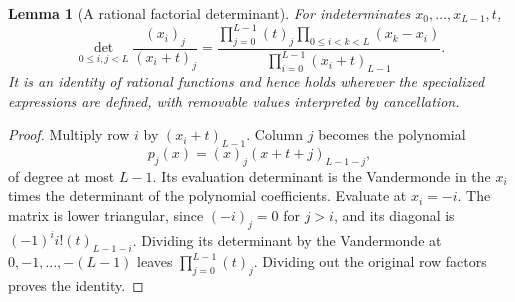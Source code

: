 \documentclass[11pt,letterpaper]{article}
\numberwithin{equation}{section}
\newtheorem{lemma}[theorem]{Lemma}
\theoremstyle{definition}\newtheorem{definition}[theorem]{Definition}
\theoremstyle{remark}\newtheorem{remark}[theorem]{Remark}
\begin{document}
\begin{lemma}[A rational factorial determinant]\label{lem:factorial-det}
For indeterminates $x_0,\ldots,x_{L-1},t$,
\begin{equation}\label{eq:factorial-det}
 \det_{0\le i,j<L}\frac{(x_i)_j}{(x_i+t)_j}
 =\frac{\displaystyle\prod_{j=0}^{L-1}(t)_j
             \prod_{0\le i<k<L}(x_k-x_i)}
        {\displaystyle\prod_{i=0}^{L-1}(x_i+t)_{L-1}}.
\end{equation}
It is an identity of rational functions and hence holds wherever the
specialized expressions are defined, with removable values interpreted
by cancellation.
\end{lemma}
\begin{proof}
Multiply row $i$ by $(x_i+t)_{L-1}$. Column $j$ becomes the polynomial
\[
 p_j(x)=(x)_j(x+t+j)_{L-1-j},
\]
of degree at most $L-1$. Its evaluation determinant is the Vandermonde
in the $x_i$ times the determinant of the polynomial coefficients.
Evaluate at $x_i=-i$. The matrix is lower triangular, since $(-i)_j=0$
for $j>i$, and its diagonal is
$(-1)^ii!(t)_{L-1-i}$. Dividing its determinant by the Vandermonde
at $0,-1,\ldots,-(L-1)$ leaves $\prod_{j=0}^{L-1}(t)_j$.
Dividing out the original row factors proves the identity.
\end{proof}
\end{document}
